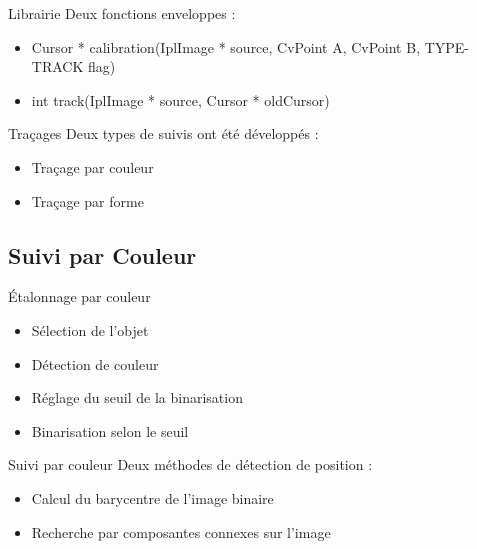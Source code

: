 \documentclass{beamer}
\begin{document}
		\begin{frame}{Librairie}
		Deux fonctions enveloppes : \\
			\begin{itemize}
				\item{Cursor * calibration(IplImage * source, CvPoint A, CvPoint B, TYPE-TRACK flag)}
				\item{int track(IplImage * source, Cursor * oldCursor)}
			\end{itemize}		
		\end{frame}

		\begin{frame}{Traçages}
		Deux types de suivis ont été développés : \\
			\begin{itemize}
				\item{Traçage par couleur}
				\item{Traçage par forme}
			\end{itemize}
		\end{frame}

		\subsection{Suivi par Couleur}
		\begin{frame}{Étalonnage par couleur}
			\begin{itemize}
				\item{Sélection de l'objet}
				\item{Détection de couleur}
				\item{Réglage du seuil de la binarisation}
				\item{Binarisation selon le seuil}
			\end{itemize}
		\end{frame}

		\begin{frame}{Suivi par couleur}
			Deux méthodes de détection de position :
			\begin{itemize}
				\item{Calcul du barycentre de l'image binaire}
				\item{Recherche par composantes connexes sur l'image}
			\end{itemize}
		\end{frame}
\end{document}
